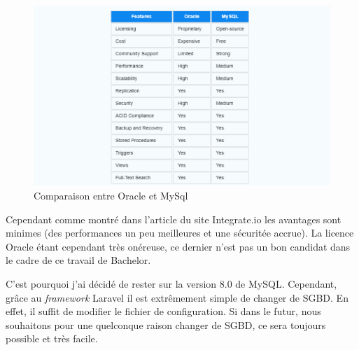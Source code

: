 \begin{center}
    \begin{figure}[H]
        \includegraphics[width=\textwidth]{./assets/figures/OracleVsMySql.png}
        \caption{Comparaison entre Oracle et MySql \label{OracleVsMySql.png}}
    \end{figure}
\end{center}
Cependant comme montré dans l'article du site Integrate.io \cite{Integrate.io} les avantages sont minimes (des performances un peu meilleures et une sécuritée accrue). La licence Oracle étant cependant très onéreuse, ce dernier n'est pas un bon candidat dans le cadre de ce travail de Bachelor.

C'est pourquoi j'ai décidé de rester sur la version 8.0 de MySQL. Cependant, grâce au \emph{framework} Laravel il est extrêmement simple de changer de SGBD. En effet, il suffit de modifier le fichier de configuration. Si dans le futur, nous souhaitons pour une quelconque raison changer de SGBD, ce sera toujours possible et très facile.

